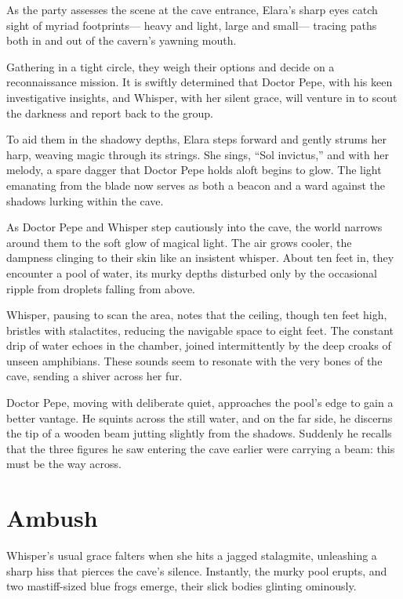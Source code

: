\documentclass[
  letterpaper,12pt,twoside,twocolumn,openany,
  nodeprecatedcode,bg=full]{dndbook}
\begin{document}
As the party assesses the scene at the cave entrance, Elara's sharp eyes
catch sight of myriad footprints--- heavy and light, large and small---
tracing paths both in and out of the cavern's yawning mouth.

Gathering in a tight circle, they weigh their options and decide on a
reconnaissance mission. It is swiftly determined that Doctor Pepe, with
his keen investigative insights, and Whisper, with her silent grace,
will venture in to scout the darkness and report back to the group.

To aid them in the shadowy depths, Elara steps forward and gently strums
her harp, weaving magic through its strings. She sings, ``Sol
invictus,'' and with her melody, a spare dagger that Doctor Pepe holds
aloft begins to glow. The light emanating from the blade now serves as
both a beacon and a ward against the shadows lurking within the cave.

As Doctor Pepe and Whisper step cautiously into the cave, the world
narrows around them to the soft glow of magical light. The air grows
cooler, the dampness clinging to their skin like an insistent whisper.
About ten feet in, they encounter a pool of water, its murky depths
disturbed only by the occasional ripple from droplets falling from
above.

Whisper, pausing to scan the area, notes that the ceiling, though ten
feet high, bristles with stalactites, reducing the navigable space to
eight feet. The constant drip of water echoes in the chamber, joined
intermittently by the deep croaks of unseen amphibians. These sounds
seem to resonate with the very bones of the cave, sending a shiver
across her fur.

Doctor Pepe, moving with deliberate quiet, approaches the pool's edge to
gain a better vantage. He squints across the still water, and on the far
side, he discerns the tip of a wooden beam jutting slightly from the
shadows. Suddenly he recalls that the three figures he saw entering the
cave earlier were carrying a beam: this must be the way across.

\section{Ambush}\label{ambush}

Whisper's usual grace falters when she hits a jagged stalagmite,
unleashing a sharp hiss that pierces the cave's silence. Instantly, the
murky pool erupts, and two mastiff-sized blue frogs emerge, their slick
bodies glinting ominously.
\end{document}
